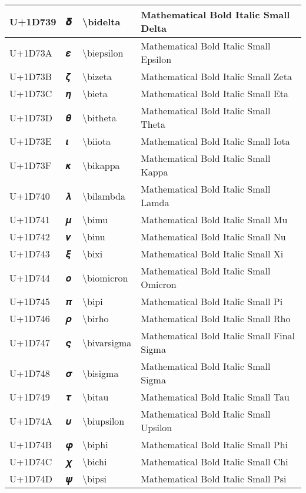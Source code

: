 \begin{table}[h]
\begin{tabulary}{\linewidth}{|L|L|L|L|}
\hline
U+1D739 & 𝜹 & {\textbackslash}bidelta & Mathematical Bold Italic Small Delta \\
\hline
U+1D73A & 𝜺 & {\textbackslash}biepsilon & Mathematical Bold Italic Small Epsilon \\
\hline
U+1D73B & 𝜻 & {\textbackslash}bizeta & Mathematical Bold Italic Small Zeta \\
\hline
U+1D73C & 𝜼 & {\textbackslash}bieta & Mathematical Bold Italic Small Eta \\
\hline
U+1D73D & 𝜽 & {\textbackslash}bitheta & Mathematical Bold Italic Small Theta \\
\hline
U+1D73E & 𝜾 & {\textbackslash}biiota & Mathematical Bold Italic Small Iota \\
\hline
U+1D73F & 𝜿 & {\textbackslash}bikappa & Mathematical Bold Italic Small Kappa \\
\hline
U+1D740 & 𝝀 & {\textbackslash}bilambda & Mathematical Bold Italic Small Lamda \\
\hline
U+1D741 & 𝝁 & {\textbackslash}bimu & Mathematical Bold Italic Small Mu \\
\hline
U+1D742 & 𝝂 & {\textbackslash}binu & Mathematical Bold Italic Small Nu \\
\hline
U+1D743 & 𝝃 & {\textbackslash}bixi & Mathematical Bold Italic Small Xi \\
\hline
U+1D744 & 𝝄 & {\textbackslash}biomicron & Mathematical Bold Italic Small Omicron \\
\hline
U+1D745 & 𝝅 & {\textbackslash}bipi & Mathematical Bold Italic Small Pi \\
\hline
U+1D746 & 𝝆 & {\textbackslash}birho & Mathematical Bold Italic Small Rho \\
\hline
U+1D747 & 𝝇 & {\textbackslash}bivarsigma & Mathematical Bold Italic Small Final Sigma \\
\hline
U+1D748 & 𝝈 & {\textbackslash}bisigma & Mathematical Bold Italic Small Sigma \\
\hline
U+1D749 & 𝝉 & {\textbackslash}bitau & Mathematical Bold Italic Small Tau \\
\hline
U+1D74A & 𝝊 & {\textbackslash}biupsilon & Mathematical Bold Italic Small Upsilon \\
\hline
U+1D74B & 𝝋 & {\textbackslash}biphi & Mathematical Bold Italic Small Phi \\
\hline
U+1D74C & 𝝌 & {\textbackslash}bichi & Mathematical Bold Italic Small Chi \\
\hline
U+1D74D & 𝝍 & {\textbackslash}bipsi & Mathematical Bold Italic Small Psi \\

\end{tabulary}
\end{table}
